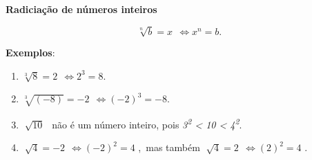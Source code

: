 \documentclass[12pt]{article}
\renewcommand{\_}{\kern-1.5pt\textunderscore\kern-1.5pt}
\begin{document}
\begin{enumerate}
\vspace{\baselineskip}
\setlength{\parskip}{8.04pt}

\vspace{\baselineskip}
\setlength{\parskip}{0.0pt}
\textbf{Radiciação de números inteiros}\par


\vspace{\baselineskip}
\par 

\vspace{\baselineskip}
\begin{adjustwidth}{1.28in}{0.0in}
 \[ \sqrt[n]{b}=x~~ \Longleftrightarrow   x^{n}=b. \] \par

\end{adjustwidth}


\vspace{\baselineskip}
\textbf{Exemplos}:\par

\begin{enumerate}
	\item  \( \sqrt[3]{8}=2~~ \Longleftrightarrow   2^{3}=8. \) \par

	\item  \( \sqrt[3]{ \left( -8 \right) }=-2~~ \Longleftrightarrow    \left( -2 \right) ^{3}=-8. \) \par

	\item  \( \sqrt[]{10}~~ \) não é um número inteiro, pois \textit{3\textsuperscript{2} < 10 < 4\textsuperscript{2}}.\par

	\item  \( \sqrt[]{4}=-2~~ \Longleftrightarrow    \left( -2 \right) ^{2}=4 \) ,\ mas também   \( \sqrt[]{4}=2~~ \Longleftrightarrow    \left( 2 \right) ^{2}=4 \) . 
\end{enumerate}\par


\end{enumerate}
\end{document}

